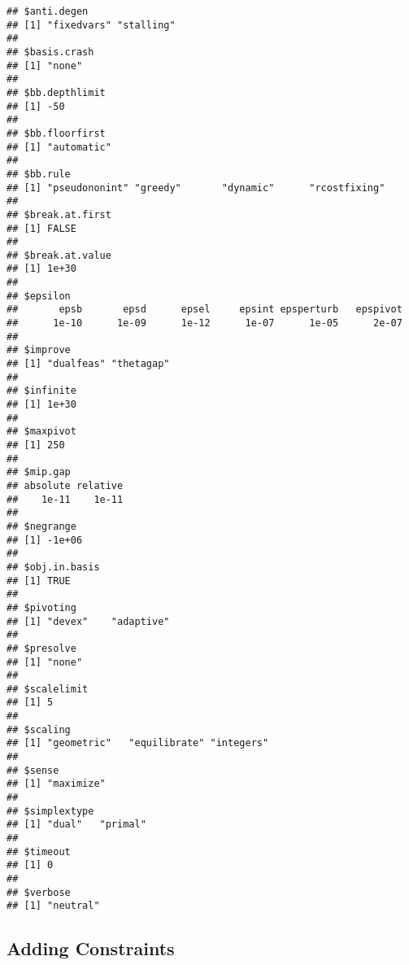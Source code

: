 \documentclass[
]{article}
\begin{document}
\begin{verbatim}
## $anti.degen
## [1] "fixedvars" "stalling" 
## 
## $basis.crash
## [1] "none"
## 
## $bb.depthlimit
## [1] -50
## 
## $bb.floorfirst
## [1] "automatic"
## 
## $bb.rule
## [1] "pseudononint" "greedy"       "dynamic"      "rcostfixing" 
## 
## $break.at.first
## [1] FALSE
## 
## $break.at.value
## [1] 1e+30
## 
## $epsilon
##       epsb       epsd      epsel     epsint epsperturb   epspivot 
##      1e-10      1e-09      1e-12      1e-07      1e-05      2e-07 
## 
## $improve
## [1] "dualfeas" "thetagap"
## 
## $infinite
## [1] 1e+30
## 
## $maxpivot
## [1] 250
## 
## $mip.gap
## absolute relative 
##    1e-11    1e-11 
## 
## $negrange
## [1] -1e+06
## 
## $obj.in.basis
## [1] TRUE
## 
## $pivoting
## [1] "devex"    "adaptive"
## 
## $presolve
## [1] "none"
## 
## $scalelimit
## [1] 5
## 
## $scaling
## [1] "geometric"   "equilibrate" "integers"   
## 
## $sense
## [1] "maximize"
## 
## $simplextype
## [1] "dual"   "primal"
## 
## $timeout
## [1] 0
## 
## $verbose
## [1] "neutral"
\end{verbatim}

\hypertarget{adding-constraints}{%
\subsection{Adding Constraints}\label{adding-constraints}}
\end{document}
